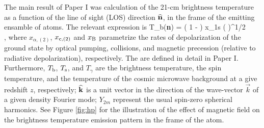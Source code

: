 The main result of Paper I was calculation of the 21-cm brightness temperature as a function of the line of sight (LOS) direction ${\bf{\widehat n}}$, in the frame of the emitting ensamble of atoms. The relevant expression is
\beq
\bga
  \delta T_{\rm b}({\bf{\widehat n}}) = \left( 1 -  \right) x_{1{\rm s}} \left(  \right)^{1/2} \\
  \times {} \mbox{,} 
\ega
\label{eq:tbsoln}
\eeq
where $x_{\alpha, (2)}$, $x_{{\rm c}, (2)}$ and $x_{\rm B}$ parametrize the rates of depolarization of the ground state by optical pumping, collisions, and magnetic precession (relative to radiative depolarization), respectively. The are defined in detail in Paper I. Furthermore,  $T_{\rm b}$, $T_{\rm s}$, and $T_\gamma$ are the brightness temperature, the spin temperature, and the temperature of the cosmic microwave background at a give redshift $z$, respectively; $\bf{\widehat k}$ is a unit vector in the direction of the wave-vector $\vec k$ of a given density Fourier mode; $Y_{2 m}$ represent the usual spin-zero spherical harmonics. See Figure \ref{fig:hp} for the illustration of the effect of magnetic field on the brightness temperature emission pattern in the frame of the atom.

